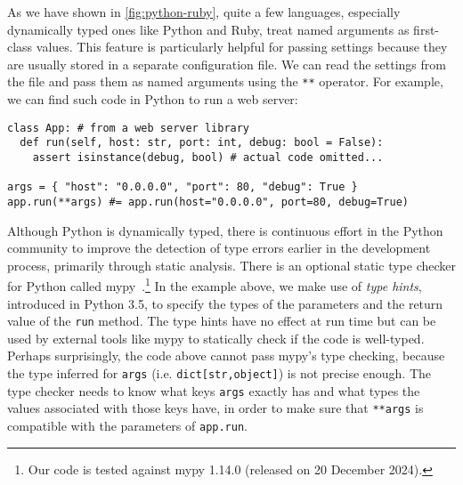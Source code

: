 As we have shown in \autoref{fig:python-ruby}, quite a few languages, especially
dynamically typed ones like Python and Ruby, treat named arguments as
first-class values. This feature is particularly helpful for passing settings
because they are usually stored in a separate configuration file. We can read
the settings from the file and pass them as named arguments using the
\lstinline{**} operator. For example, we can find such code in Python to run a
web server:
\begin{lstlisting}[language={[3]Python}]
class App: # from a web server library
  def run(self, host: str, port: int, debug: bool = False):
    assert isinstance(debug, bool) # actual code omitted...

args = { "host": "0.0.0.0", "port": 80, "debug": True }
app.run(**args) #= app.run(host="0.0.0.0", port=80, debug=True)
\end{lstlisting}
Although Python is dynamically typed, there is continuous effort in the Python
community to improve the detection of type errors earlier in the development
process, primarily through static analysis. There is an optional static type
checker for Python called mypy~\citep{mypy}.\footnote{Our code is tested against
mypy 1.14.0 (released on 20 December 2024).} In the example above, we make use
of \emph{type hints}, introduced in Python 3.5, to specify the types of the
parameters and the return value of the \lstinline{run} method. The type hints
have no effect at run time but can be used by external tools like mypy to
statically check if the code is well-typed. Perhaps surprisingly, the code above
cannot pass mypy's type checking, because the type inferred for \lstinline{args}
(i.e. \lstinline{dict[str,object]}) is not precise enough. The type checker
needs to know what keys \lstinline{args} exactly has and what types the values
associated with those keys have, in order to make sure that \lstinline{**args}
is compatible with the parameters of \lstinline{app.run}.

